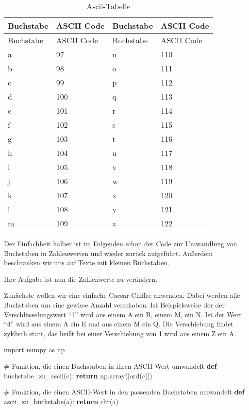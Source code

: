 \documentclass[
  letterpaper,
  DIV=11,
  numbers=noendperiod]{scrreprt}
\newenvironment{Shaded}{\begin{snugshade}}{\end{snugshade}}
\newcommand{\BuiltInTok}[1]{\textcolor[rgb]{0.00,0.23,0.31}{#1}}
\newcommand{\CommentTok}[1]{\textcolor[rgb]{0.37,0.37,0.37}{#1}}
\newcommand{\ControlFlowTok}[1]{\textcolor[rgb]{0.00,0.23,0.31}{\textbf{#1}}}
\newcommand{\ImportTok}[1]{\textcolor[rgb]{0.00,0.46,0.62}{#1}}
\newcommand{\KeywordTok}[1]{\textcolor[rgb]{0.00,0.23,0.31}{\textbf{#1}}}
\newcommand{\NormalTok}[1]{\textcolor[rgb]{0.00,0.23,0.31}{#1}}
\begin{document}
\begin{tcolorbox}
\begin{longtable}[]{@{}llll@{}}
\caption{Ascii-Tabelle}\label{tbl-ascii}\tabularnewline
\toprule\noalign{}
Buchstabe & ASCII Code & Buchstabe & ASCII Code \\
\midrule\noalign{}
\endfirsthead
\toprule\noalign{}
Buchstabe & ASCII Code & Buchstabe & ASCII Code \\
\midrule\noalign{}
\endhead
\bottomrule\noalign{}
\endlastfoot
a & 97 & n & 110 \\
b & 98 & o & 111 \\
c & 99 & p & 112 \\
d & 100 & q & 113 \\
e & 101 & r & 114 \\
f & 102 & s & 115 \\
g & 103 & t & 116 \\
h & 104 & u & 117 \\
i & 105 & v & 118 \\
j & 106 & w & 119 \\
k & 107 & x & 120 \\
l & 108 & y & 121 \\
m & 109 & z & 122 \\
\end{longtable}

Der Einfachheit halber ist im Folgenden schon der Code zur Umwandlung
von Buchstaben in Zahlenwerten und wieder zurück aufgeführt. Außerdem
beschränken wir uns auf Texte mit kleinen Buchstaben.

Ihre Aufgabe ist nun die Zahlenwerte zu verändern.

Zunächste wollen wir eine einfache Caesar-Chiffre anwenden. Dabei werden
alle Buchstaben um eine gewisse Anzahl verschoben. Ist Beispielsweise
der der Verschlüsselungswert ``1'' wird aus einem A ein B, einem M, ein
N. Ist der Wert ``4'' wird aus einem A ein E und aus einem M ein Q. Die
Verschiebung findet zyklisch statt, das heißt bei einer Verschiebung von
1 wird aus einem Z ein A.

\begin{Shaded}
\begin{Highlighting}[]
\ImportTok{import}\NormalTok{ numpy }\ImportTok{as}\NormalTok{ np}

\CommentTok{\# Funktion, die einen Buchstaben in ihren ASCII{-}Wert umwandelt}
\KeywordTok{def}\NormalTok{ buchstabe\_zu\_ascii(c):}
    \ControlFlowTok{return}\NormalTok{ np.array([}\BuiltInTok{ord}\NormalTok{(c)])}

\CommentTok{\# Funktion, die einen ASCII{-}Wert in den passenden Buchstaben umwandelt}
\KeywordTok{def}\NormalTok{ ascii\_zu\_buchstabe(a):}
    \ControlFlowTok{return} \BuiltInTok{chr}\NormalTok{(a)}
\end{Highlighting}
\end{Shaded}


\end{tcolorbox}
\end{document}
